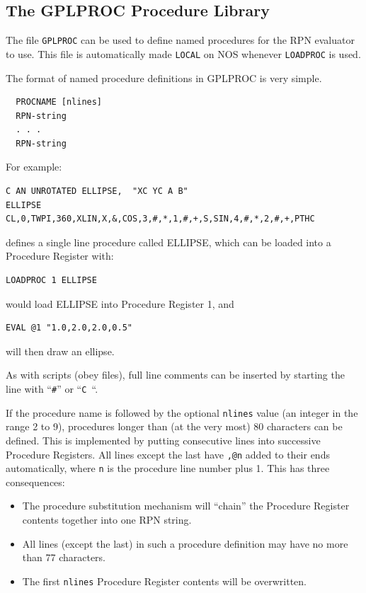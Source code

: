 \documentclass[a4paper,twoside,11pt]{article}
\newcommand{\newpara}{\par\vspace{4mm}\noindent}
\begin{document}
\subsection{The GPLPROC Procedure Library}\label{gplproc-sect}
\newpara
The file \texttt{GPLPROC} can be used to define named procedures for the RPN evaluator to use. This file is
automatically made \texttt{LOCAL} on NOS whenever \texttt{LOADPROC} is used.

\newpara
The format of named procedure definitions in GPLPROC is very simple.
\begin{lstlisting}
  PROCNAME [nlines]
  RPN-string
  . . .
  RPN-string
\end{lstlisting}

\newpara
For example:
\begin{lstlisting}
C AN UNROTATED ELLIPSE,  "XC YC A B"
ELLIPSE
CL,0,TWPI,360,XLIN,X,&,COS,3,#,*,1,#,+,S,SIN,4,#,*,2,#,+,PTHC
\end{lstlisting}
defines a single line procedure called ELLIPSE, which can be loaded into a Procedure Register
with:
\begin{lstlisting}
LOADPROC 1 ELLIPSE
\end{lstlisting}
would load ELLIPSE into Procedure Register 1, and
\begin{lstlisting}
EVAL @1 "1.0,2.0,2.0,0.5"
\end{lstlisting}
will then draw an ellipse.

\newpara
As with scripts (obey files), full line comments can be inserted by starting the line with
``\texttt{\#}'' or ``\texttt{C }``.

\newpara
If the procedure name is followed by the optional \texttt{nlines} value (an integer in the range 2 to 9),
procedures longer than (at the very most) 80 characters can be defined. This is implemented by putting
consecutive lines into successive Procedure Registers. All lines except the last have \texttt{,@n} added to their
ends automatically, where \texttt{n} is the procedure line number plus 1. This has three consequences:
\begin{itemize}
\item The procedure substitution mechanism will ``chain'' the Procedure Register contents together into one
  RPN string.
\item All lines (except the last) in such a procedure definition may have no more than 77 characters.
\item The first \texttt{nlines} Procedure Register contents will be overwritten.
\end{itemize}
\end{document}
